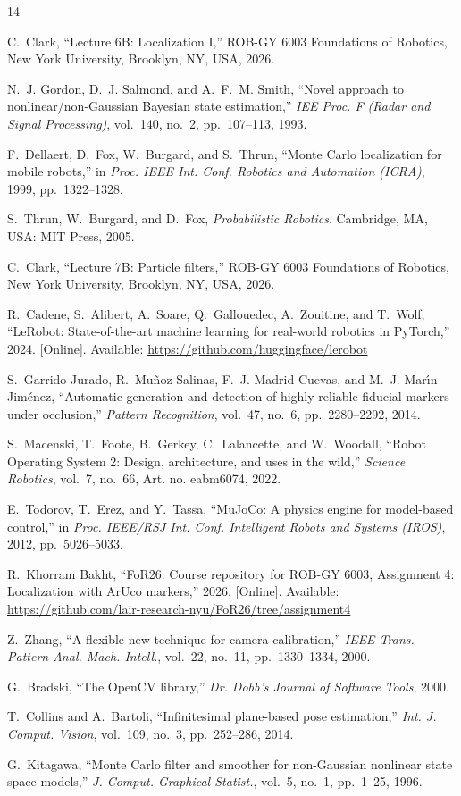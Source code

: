 \documentclass[conference]{IEEEtran}
\begin{document}
\begin{thebibliography}{14}

C.~Clark, ``Lecture 6B: Localization I,'' ROB-GY 6003 Foundations of Robotics, New York University, Brooklyn, NY, USA, 2026.

N.~J. Gordon, D.~J. Salmond, and A.~F.~M. Smith, ``Novel approach to nonlinear/non-Gaussian Bayesian state estimation,'' \emph{IEE Proc. F (Radar and Signal Processing)}, vol.~140, no.~2, pp.~107--113, 1993.

F.~Dellaert, D.~Fox, W.~Burgard, and S.~Thrun, ``Monte Carlo localization for mobile robots,'' in \emph{Proc. IEEE Int. Conf. Robotics and Automation (ICRA)}, 1999, pp.~1322--1328.

S.~Thrun, W.~Burgard, and D.~Fox, \emph{Probabilistic Robotics}. Cambridge, MA, USA: MIT Press, 2005.

C.~Clark, ``Lecture 7B: Particle filters,'' ROB-GY 6003 Foundations of Robotics, New York University, Brooklyn, NY, USA, 2026.

R.~Cadene, S.~Alibert, A.~Soare, Q.~Gallouedec, A.~Zouitine, and T.~Wolf, ``LeRobot: State-of-the-art machine learning for real-world robotics in PyTorch,'' 2024. [Online]. Available: \url{https://github.com/huggingface/lerobot}

S.~Garrido-Jurado, R.~Mu\~{n}oz-Salinas, F.~J. Madrid-Cuevas, and M.~J. Mar\'{\i}n-Jim\'{e}nez, ``Automatic generation and detection of highly reliable fiducial markers under occlusion,'' \emph{Pattern Recognition}, vol.~47, no.~6, pp.~2280--2292, 2014.

S.~Macenski, T.~Foote, B.~Gerkey, C.~Lalancette, and W.~Woodall, ``Robot Operating System 2: Design, architecture, and uses in the wild,'' \emph{Science Robotics}, vol.~7, no.~66, Art. no. eabm6074, 2022.

E.~Todorov, T.~Erez, and Y.~Tassa, ``MuJoCo: A physics engine for model-based control,'' in \emph{Proc. IEEE/RSJ Int. Conf. Intelligent Robots and Systems (IROS)}, 2012, pp.~5026--5033.

R.~Khorram Bakht, ``FoR26: Course repository for ROB-GY 6003, Assignment 4: Localization with ArUco markers,'' 2026. [Online]. Available: \url{https://github.com/lair-research-nyu/FoR26/tree/assignment4}

Z.~Zhang, ``A flexible new technique for camera calibration,'' \emph{IEEE Trans. Pattern Anal. Mach. Intell.}, vol.~22, no.~11, pp.~1330--1334, 2000.

G.~Bradski, ``The OpenCV library,'' \emph{Dr. Dobb's Journal of Software Tools}, 2000.

T.~Collins and A.~Bartoli, ``Infinitesimal plane-based pose estimation,'' \emph{Int. J. Comput. Vision}, vol.~109, no.~3, pp.~252--286, 2014.

G.~Kitagawa, ``Monte Carlo filter and smoother for non-Gaussian nonlinear state space models,'' \emph{J. Comput. Graphical Statist.}, vol.~5, no.~1, pp.~1--25, 1996.

\end{thebibliography}
\end{document}
